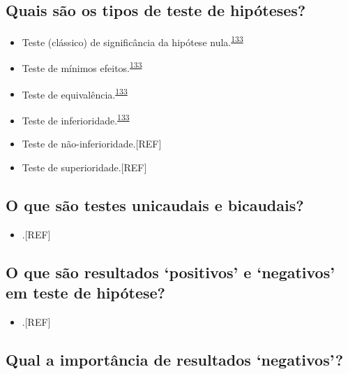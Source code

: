 \documentclass[
]{book}
\providecommand{\tightlist}{%
  \setlength{\itemsep}{0pt}\setlength{\parskip}{0pt}}
\begin{document}
\hypertarget{quais-suxe3o-os-tipos-de-teste-de-hipuxf3teses}{%
\subsection{Quais são os tipos de teste de hipóteses?}\label{quais-suxe3o-os-tipos-de-teste-de-hipuxf3teses}}

\begin{itemize}
\item
  Teste (clássico) de significância da hipótese nula.\textsuperscript{\protect\hyperlink{ref-lakens2018}{133}}
\item
  Teste de mínimos efeitos.\textsuperscript{\protect\hyperlink{ref-lakens2018}{133}}
\item
  Teste de equivalência.\textsuperscript{\protect\hyperlink{ref-lakens2018}{133}}
\item
  Teste de inferioridade.\textsuperscript{\protect\hyperlink{ref-lakens2018}{133}}
\item
  Teste de não-inferioridade.{[}REF{]}
\item
  Teste de superioridade.{[}REF{]}
\end{itemize}

\hypertarget{o-que-suxe3o-testes-unicaudais-e-bicaudais}{%
\subsection{O que são testes unicaudais e bicaudais?}\label{o-que-suxe3o-testes-unicaudais-e-bicaudais}}

\begin{itemize}
\tightlist
\item
  .{[}REF{]}
\end{itemize}

\hypertarget{o-que-suxe3o-resultados-positivos-e-negativos-em-teste-de-hipuxf3tese}{%
\subsection{O que são resultados `positivos' e `negativos' em teste de hipótese?}\label{o-que-suxe3o-resultados-positivos-e-negativos-em-teste-de-hipuxf3tese}}

\begin{itemize}
\tightlist
\item
  .{[}REF{]}
\end{itemize}

\hypertarget{qual-a-importuxe2ncia-de-resultados-negativos}{%
\subsection{Qual a importância de resultados `negativos'?}\label{qual-a-importuxe2ncia-de-resultados-negativos}}
\end{document}
